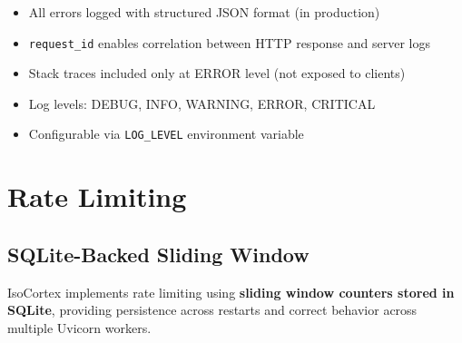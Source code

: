 \documentclass[11pt,a4paper]{article}
\newcommand{\inlinecode}[1]{\texttt{\small\colorbox{ctCodeBg}{#1}}}
\begin{document}
\begin{itemize}
    \item All errors logged with structured JSON format (in production)
    \item \inlinecode{request\_id} enables correlation between HTTP response and server logs
    \item Stack traces included only at ERROR level (not exposed to clients)
    \item Log levels: DEBUG, INFO, WARNING, ERROR, CRITICAL
    \item Configurable via \inlinecode{LOG\_LEVEL} environment variable
\end{itemize}

\section{Rate Limiting}

\subsection{SQLite-Backed Sliding Window}

IsoCortex implements rate limiting using \textbf{sliding window counters stored in SQLite}, providing persistence across restarts and correct behavior across multiple Uvicorn workers.
\end{document}
